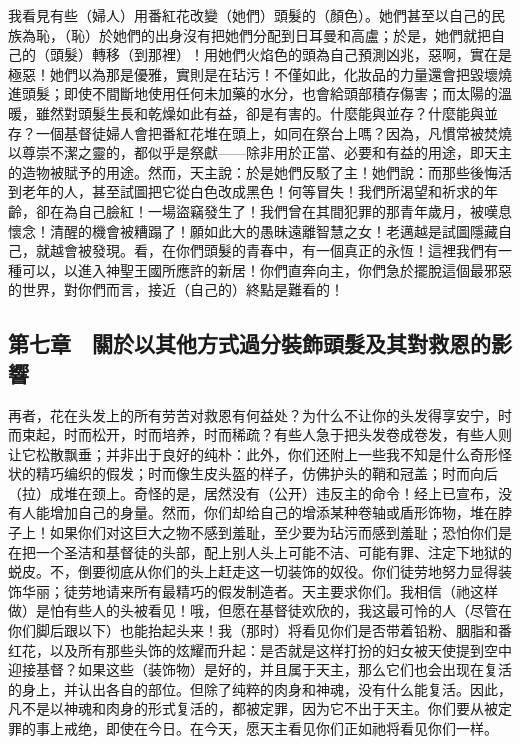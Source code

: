 我看見有些（婦人）用番紅花改變（她們）頭髮的（顏色）。她們甚至以自己的民族為恥，（恥）於她們的出身沒有把她們分配到日耳曼和高盧；於是，她們就把自己的（頭髮）轉移（到那裡）！用她們火焰色的頭為自己預測凶兆，惡啊，實在是極惡！她們以為那是優雅，實則是在玷污！不僅如此，化妝品的力量還會把毀壞燒進頭髮；即使不間斷地使用任何未加藥的水分，也會給頭部積存傷害；而太陽的溫暖，雖然對頭髮生長和乾燥如此有益，卻是有害的。什麼能與並存？什麼能與並存？一個基督徒婦人會把番紅花堆在頭上，如同在祭台上嗎？因為，凡慣常被焚燒以尊崇不潔之靈的，都似乎是祭獻——除非用於正當、必要和有益的用途，即天主的造物被賦予的用途。然而，天主說：於是她們反駁了主！她們說：而那些後悔活到老年的人，甚至試圖把它從白色改成黑色！何等冒失！我們所渴望和祈求的年齡，卻在為自己臉紅！一場盜竊發生了！我們曾在其間犯罪的那青年歲月，被嘆息懷念！清醒的機會被糟蹋了！願如此大的愚昧遠離智慧之女！老邁越是試圖隱藏自己，就越會被發現。看，在你們頭髮的青春中，有一個真正的永恆！這裡我們有一種可以，以進入神聖王國所應許的新居！你們直奔向主，你們急於擺脫這個最邪惡的世界，對你們而言，接近（自己的）終點是難看的！\par


\subsection{第七章　關於以其他方式過分裝飾頭髮及其對救恩的影響}

再者，花在头发上的所有劳苦对救恩有何益处？为什么不让你的头发得享安宁，时而束起，时而松开，时而培养，时而稀疏？有些人急于把头发卷成卷发，有些人则让它松散飘垂；并非出于良好的纯朴：此外，你们还附上一些我不知是什么奇形怪状的精巧编织的假发；时而像生皮头盔的样子，仿佛护头的鞘和冠盖；时而向后（拉）成堆在颈上。奇怪的是，居然没有（公开）违反主的命令！经上已宣布，没有人能增加自己的身量。然而，你们却给自己的增添某种卷轴或盾形饰物，堆在脖子上！如果你们对这巨大之物不感到羞耻，至少要为玷污而感到羞耻；恐怕你们是在把一个圣洁和基督徒的头部，配上别人头上可能不洁、可能有罪、注定下地狱的蜕皮。不，倒要彻底从你们的头上赶走这一切装饰的奴役。你们徒劳地努力显得装饰华丽；徒劳地请来所有最精巧的假发制造者。天主要求你们。我相信（祂这样做）是怕有些人的头被看见！哦，但愿在基督徒欢欣的，我这最可怜的人（尽管在你们脚后跟以下）也能抬起头来！我（那时）将看见你们是否带着铅粉、胭脂和番红花，以及所有那些头饰的炫耀而升起：是否就是这样打扮的妇女被天使提到空中迎接基督？如果这些（装饰物）是好的，并且属于天主，那么它们也会出现在复活的身上，并认出各自的部位。但除了纯粹的肉身和神魂，没有什么能复活。因此，凡不是以神魂和肉身的形式复活的，都被定罪，因为它不出于天主。你们要从被定罪的事上戒绝，即使在今日。在今天，愿天主看见你们正如祂将看见你们一样。\par

